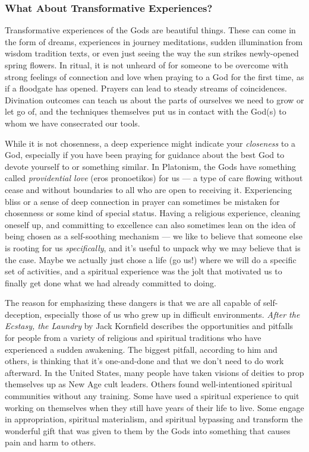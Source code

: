 \documentclass[
]{book}
\begin{document}
\hypertarget{what-about-transformative-experiences}{%
\subsubsection{What About Transformative Experiences?}\label{what-about-transformative-experiences}}

Transformative experiences of the Gods are beautiful things. These can come in the form of dreams, experiences in journey meditations, sudden illumination from wisdom tradition texts, or even just seeing the way the sun strikes newly-opened spring flowers. In ritual, it is not unheard of for someone to be overcome with strong feelings of connection and love when praying to a God for the first time, as if a floodgate has opened. Prayers can lead to steady streams of coincidences. Divination outcomes can teach us about the parts of ourselves we need to grow or let go of, and the techniques themselves put us in contact with the God(s) to whom we have consecrated our tools.

While it is not chosenness, a deep experience might indicate your \emph{closeness} to a God, especially if you have been praying for guidance about the best God to devote yourself to or something similar. In Platonism, the Gods have something called \emph{providential love} (eros pronoetikos) for us --- a type of care flowing without cease and without boundaries to all who are open to receiving it. Experiencing bliss or a sense of deep connection in prayer can sometimes be mistaken for chosenness or some kind of special status. Having a religious experience, cleaning oneself up, and committing to excellence can also sometimes lean on the idea of being chosen as a self-soothing mechanism --- we like to believe that someone else is rooting for us \emph{specifically}, and it's useful to unpack why we may believe that is the case. Maybe we actually just chose a life (go us!) where we will do a specific set of activities, and a spiritual experience was the jolt that motivated us to finally get done what we had already committed to doing.

The reason for emphasizing these dangers is that we are all capable of self-deception, especially those of us who grew up in difficult environments. \emph{After the Ecstasy, the Laundry} by Jack Kornfield describes the opportunities and pitfalls for people from a variety of religious and spiritual traditions who have experienced a sudden awakening. The biggest pitfall, according to him and others, is thinking that it's one-and-done and that we don't need to do work afterward. In the United States, many people have taken visions of deities to prop themselves up as New Age cult leaders. Others found well-intentioned spiritual communities without any training. Some have used a spiritual experience to quit working on themselves when they still have years of their life to live. Some engage in appropriation, spiritual materialism, and spiritual bypassing and transform the wonderful gift that was given to them by the Gods into something that causes pain and harm to others.
\end{document}

